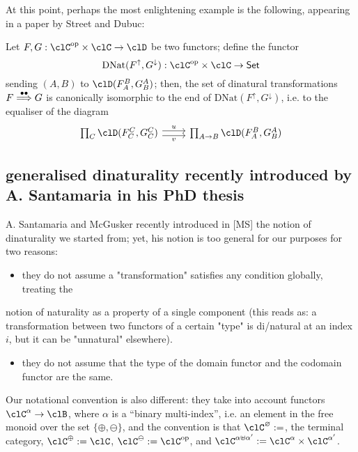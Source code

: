 \documentclass[11pt]{amsart}
\begin{document}
At this point, perhaps the most enlightening example is the following, appearing in a paper by Street and Dubuc: 

\begin{proposition}
Let $F,G : \clC^\text{op} \times \clC \to \clD$ be two functors; define the functor 
\[
\mathrm{DNat}(F^\uparrow,G^\downarrow) : \clC^\text{op} \times \clC \to \mathsf{Set}
\] sending $(A,B)$ to $\clD(F_A^B, G^A_B)$; then, the set of dinatural transformations $F \overset{\bullet\bullet}\Longrightarrow G$ is canonically isomorphic to the end of $\text{DNat}(F^\uparrow,G^\downarrow)$, i.e. to the equaliser of the diagram  
\[
\begin{tikzcd}
	\prod_C \clD(F_C^C,G_C^C) \ar[r,shift left, "u"] \ar[r,shift right, "v"'] & \prod_{A\to B} \clD(F_A^B, G_B^A)
\end{tikzcd}	
\]
\end{proposition}

\subsection{generalised dinaturality recently introduced by A. Santamaria in his PhD thesis}
\label{sec:orgc27d079}

A. Santamaria and McGusker recently introduced in [MS] the notion of dinaturality we started from; 
yet, his notion is too general for our purposes for two reasons:

\begin{itemize}
\item they do not assume a "transformation" satisfies any condition globally, treating the
\end{itemize}
notion of naturality as a property of a single component (this reads as: a transformation between two functors of a certain "type" is di/natural at an index \(i\), but it can be "unnatural" elsewhere). 
\begin{itemize}
\item they do not assume that the type of the domain functor and the codomain functor are the same.
\end{itemize}

Our notational convention is also different: they take into account functors \(\clC^\alpha \to \clB\), where \(\alpha\) is a ``binary multi-index'', i.e. an element in the free monoid over the set \(\{\oplus,\ominus\}\), and the convention is that \(\clC^\varnothing := \*\), the terminal category, \(\clC^\oplus := \clC\), \(\clC^\ominus := \clC^\op\), and \(\clC^{\alpha \uplus \alpha'} := \clC^\alpha \times \clC^{\alpha'}\).
\end{document}
